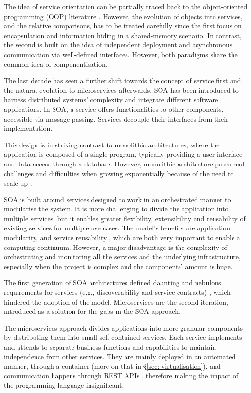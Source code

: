 The idea of service orientation can be partially traced back to the object-oriented programming (OOP) literature \cite{microservices-today}. However, the evolution of objects into services, and the relative comparisons, has to be treated carefully since the first focus on encapsulation and information hiding in a shared-memory scenario. In contrast, the second is built on the idea of independent deployment and asynchronous communication via well-defined interfaces. However, both paradigms share the common idea of componentisation.

The last decade has seen a further shift towards the concept of service first and the natural evolution to microservices afterwards. SOA has been introduced to harness distributed systems' complexity and integrate different software applications. In SOA, a service offers functionalities to other components, accessible via message passing. Services decouple their interfaces from their implementation.

This design is in striking contrast to monolithic architectures, where the application is composed of a single program, typically providing a user interface and data access through a database. However, monolithic architecture poses real challenges and difficulties when growing exponentially because of the need to scale up \cite{microservices-today}.

SOA is built around services designed to work in an orchestrated manner to modularise the system. It is more challenging to divide the application into multiple services, but it enables greater flexibility, extensibility and reusability of existing services for multiple use cases. The model's benefits are application modularity, and service reusability \cite{cloud-to-thing}, which are both very important to enable a computing continuum. However, a major disadvantage is the complexity of orchestrating and monitoring all the services and the underlying infrastructure, especially when the project is complex and the components' amount is huge.

The first generation of SOA architectures defined daunting and nebulous requirements for services (e.g., discoverability and service contracts) \cite{microservices-today}, which hindered the adoption of the model. Microservices are the second iteration, introduced as a solution for the gaps in the SOA approach.

The microservices approach divides applications into more granular components by distributing them into small self-contained services. Each service implements and attends to separate business functions and capabilities to maintain independence from other services. They are mainly deployed in an automated manner, through a container (more on that in §\ref{sec: virtualisation}), and communication happens through REST APIs \cite{rest}, therefore making the impact of the programming language insignificant.

